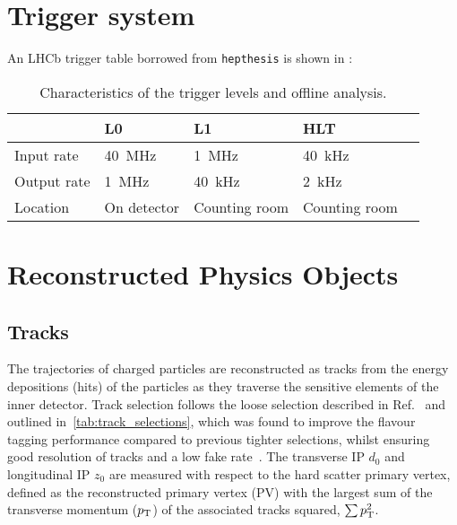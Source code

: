\section{Trigger system}
\label{sec:bg-theory:triggers}
An LHCb trigger table borrowed from \texttt{hepthesis} is shown in :

\begin{table}[bht]
  \begin{tabular}{lllll}
                & L0              & L1              & HLT             \\
    \midrule
    Input rate  & \SI{40}{\MHz} & \SI{1}{\MHz}  & \SI{40}{\kHz} \\
    Output rate & \SI{1}{\MHz}  & \SI{40}{\kHz} & \SI{2}{\kHz}  \\
    Location    & On detector     & Counting room   & Counting room   \\
  \end{tabular}
  \caption{Characteristics of the trigger levels and offline analysis.}
  \label{tab:bg-theory:trigger_details}
\end{table}

\section{Reconstructed Physics Objects}\label{sec:physics-objects}

\subsection{Tracks}\label{sec:tracks}

The trajectories of charged particles are reconstructed as tracks from the energy depositions (hits) of the particles as they traverse the sensitive elements of the inner detector.
Track selection follows the loose selection described in Ref.~\cite{ATL-PHYS-PUB-2020-014} and outlined in~\cref{tab:track_selections}, which was found to improve the flavour tagging performance compared to previous tighter selections, whilst ensuring good resolution of tracks and a low fake rate~\cite{PERF-2015-08}.
The transverse IP $d_0$ and longitudinal IP $z_0$ are measured with respect to the hard scatter primary vertex, defined as the reconstructed primary vertex (PV) with the largest sum of the transverse momentum ($p_{\text{T}}$) of the associated tracks squared, $\sum p_{\text{T}}^2$.

